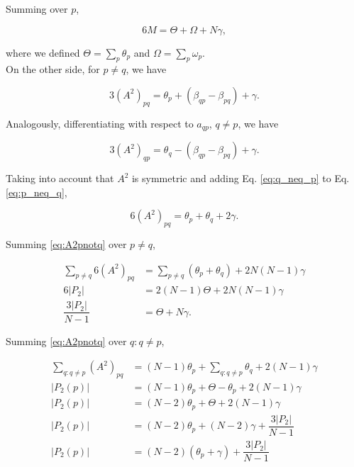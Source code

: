 \documentclass{article}
\begin{document}
Summing over $p$,

\begin{equation} \label{eq:diagonal}
    6 M = \Theta + \Omega + N \gamma,
\end{equation}

where we defined $\Theta = \sum_p \theta_p$ and $\Omega = \sum_p \omega_p$.
\\

On the other side, for $p\neq q$, we have

\begin{equation} \label{eq:p_neq_q}
    3 (A^2)_{pq} = \theta_p + (\beta_{qp} - \beta_{pq}) + \gamma.
\end{equation}

Analogously, differentiating with respect to $a_{qp}$, $q \neq p$, we have

\begin{equation}\label{eq:q_neq_p}
    3 (A^2)_{qp} = \theta_q - (\beta_{qp} - \beta_{pq}) + \gamma.
\end{equation}

Taking into account that $A^2$ is symmetric and adding Eq. \ref{eq:q_neq_p} to Eq. \ref{eq:p_neq_q}, 

\begin{equation} \label{eq:A2pnotq}
    6 (A^2)_{pq} = \theta_p + \theta_q + 2 \gamma.
\end{equation} 



Summing \ref{eq:A2pnotq} over $p\neq q$,

\begin{align}
    \sum_{p\neq q}6 (A^2)_{pq} &=\sum_{p\neq q} (\theta_p + \theta_q) +2 N(N-1) \gamma \nonumber \\
    6 |P_2| &= 2(N-1) \Theta + 2N(N-1) \gamma \nonumber \\
    \dfrac{3 |P_2|}{N-1} &= \Theta + N \gamma. \label{eq:sum_mu}
\end{align}

Summing \ref{eq:A2pnotq} over $q:q\neq p$,

\begin{align}
    \sum_{q:q\neq p} (A^2)_{pq} &= (N-1) \theta_p + \sum_{q:q\neq p} \theta_q + 2(N-1)\gamma \nonumber\\ 
    |P_2(p)| &= (N-1) \theta_p + \Theta - \theta_p + 2(N-1)\gamma \nonumber\\ 
    |P_2(p)| &= (N-2) \theta_p + \Theta + 2(N-1)\gamma \nonumber \\
    |P_2(p)| &= (N-2) \theta_p + (N-2)\gamma + \dfrac{3 |P_2|}{N-1} \nonumber \\
    |P_2(p)| &= (N-2) (\theta_p + \gamma) + \dfrac{3 |P_2|}{N-1}
\end{align}
\end{document}
